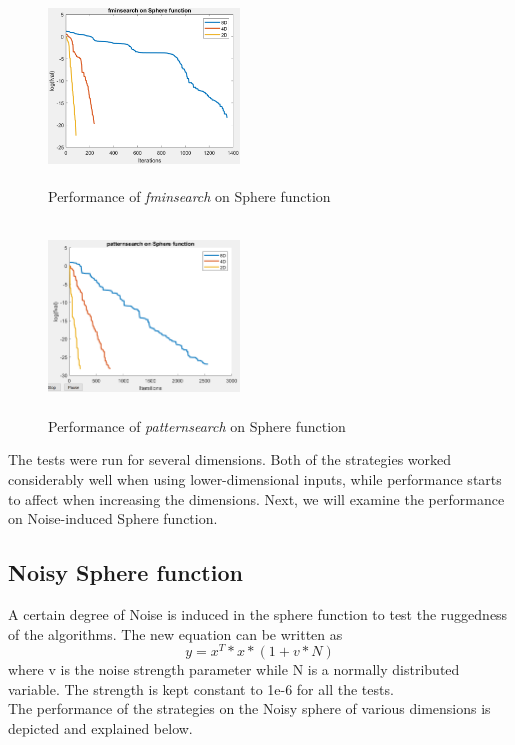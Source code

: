 \begin{figure}[H]
\includegraphics[height=2in, width=2in]{images/fminsearch_sphere}
\caption{Performance of \textit{fminsearch} on Sphere function}
\end{figure}

\begin{figure}[H]
\includegraphics[height=2in, width=2in]{images/patternsearch_sphere}
\caption{Performance of \textit{patternsearch} on Sphere function}
\end{figure}

The tests were run for several dimensions. Both of the strategies worked considerably well when using lower-dimensional inputs, while performance starts to affect when increasing the dimensions. Next, we will examine the performance on Noise-induced Sphere function.

\subsection{Noisy Sphere function}
A certain degree of Noise is induced in the sphere function to test the ruggedness of the algorithms. The new equation can be written as 
\begin{equation}
  y = x^T*x*(1 + v*N)
\end{equation}    
where v is the noise strength parameter while N is a normally distributed variable. The strength is kept constant to 1e-6 for all the tests.\\
The performance of the strategies on the Noisy sphere of various dimensions is depicted and explained below.

